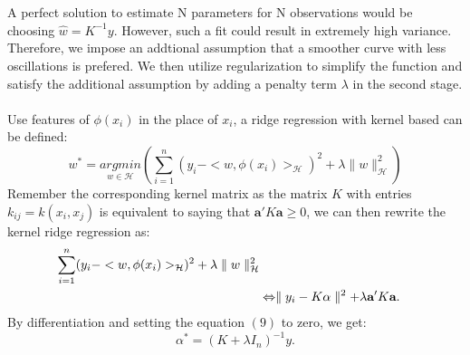 \\ \\
A perfect solution to estimate N parameters for N observations would be choosing $\hat{w}=K^{-1}y$. However, such a fit could result in extremely high variance. Therefore, we impose an addtional assumption 
that a smoother curve with less oscillations is prefered. We then utilize regularization to simplify the function and satisfy the additional assumption by adding a penalty term $\lambda$ in 
the second stage. 
\\ \\
Use features of $\phi(x_i)$ in the place of $x_i$, a ridge regression with kernel based can be defined:
\begin{equation}
    w^*=\underset{w\in\mathcal{H}}{argmin}\left(\sum_{i=1}^n(y_i-<w,\phi(x_i)>_\mathcal{H})^2+\lambda\parallel w\parallel_\mathcal{H}^2\right)
\end{equation}
Remember the corresponding kernel matrix as the matrix $K$ with entries $k_{ij}=k(x_i,x_j)$ is equivalent to saying that $\textbf{a}'K \textbf{a}\geq 0$, we can then rewrite the kernel ridge regression as:
\begin{align}
    \sum_{i=1}^n(y_i-<w,\phi(x_i)>_\mathcal{H})^2+\lambda\parallel w\parallel_\mathcal{H}^2 \notag\\
    &\Leftrightarrow\parallel y_i-K \alpha\parallel^2+\lambda \textbf{a}' K\textbf{a}.
\end{align}
By differentiation and setting the equation $(9)$ to zero, we get:
\begin{equation}
    \alpha^{*}=(K+\lambda I_n)^{-1}y.
\end{equation}


